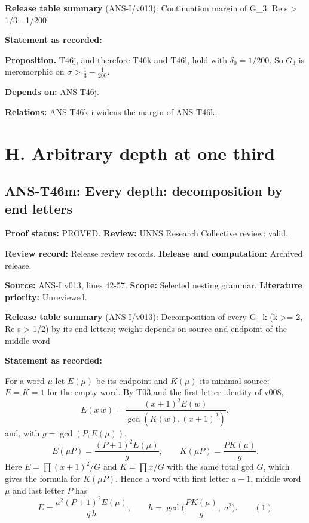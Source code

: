\documentclass[
  11pt,
]{article}
\begin{document}
\textbf{Release table summary} (ANS-I/v013): Continuation margin of
G\_3: Re s \textgreater{} 1/3 - 1/200

\textbf{Statement as recorded:}

\textbf{Proposition.} T46j, and therefore T46k and T46l, hold with
\(\delta_0=1/200\). So \(G_3\) is meromorphic on
\(\sigma>\frac13-\frac1{200}\).

\textbf{Depends on:} ANS-T46j.

\textbf{Relations:} ANS-T46k-i widens the margin of ANS-T46k.

\hypertarget{h.-arbitrary-depth-at-one-third}{%
\section{H. Arbitrary depth at one
third}\label{h.-arbitrary-depth-at-one-third}}

\hypertarget{ans-t46m-every-depth-decomposition-by-end-letters}{%
\subsection{ANS-T46m: Every depth: decomposition by end
letters}\label{ans-t46m-every-depth-decomposition-by-end-letters}}

\textbf{Proof status:} PROVED. \textbf{Review:} UNNS Research Collective
review: valid.

\textbf{Review record:} Release review records. \textbf{Release and
computation:} Archived release.

\textbf{Source:} ANS-I v013, lines 42-57. \textbf{Scope:} Selected
nesting grammar. \textbf{Literature priority:} Unreviewed.

\textbf{Release table summary} (ANS-I/v013): Decomposition of every G\_k
(k \textgreater= 2, Re s \textgreater{} 1/2) by its end letters; weight
depends on source and endpoint of the middle word

\textbf{Statement as recorded:}

For a word \(\mu\) let \(E(\mu)\) be its endpoint and \(K(\mu)\) its
minimal source; \(E=K=1\) for the empty word. By T03 and the
first-letter identity of v008,
\[E(x\,w)=\frac{(x+1)^2E(w)}{\gcd(K(w),(x+1)^2)},\] and, with
\(g=\gcd(P,E(\mu))\),
\[E(\mu P)=\frac{(P+1)^2E(\mu)}g,\qquad K(\mu P)=\frac{PK(\mu)}g.\] Here
\(E=\prod(x+1)^2/G\) and \(K=\prod x/G\) with the same total gcd \(G\),
which gives the formula for \(K(\mu P)\). Hence a word with first letter
\(a-1\), middle word \(\mu\) and last letter \(P\) has
\[E=\frac{a^2(P+1)^2E(\mu)}{g\,h},\qquad h=\gcd\Big(\frac{PK(\mu)}g,\;a^2\Big).\qquad(1)\]
\end{document}
